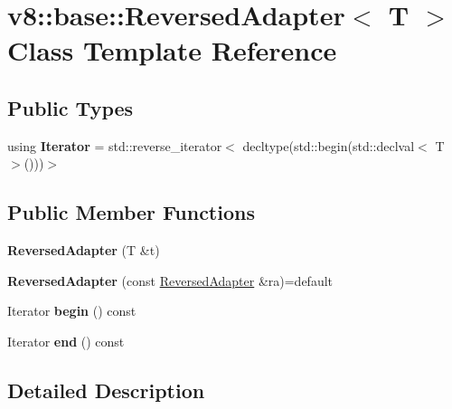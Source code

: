 \hypertarget{classv8_1_1base_1_1ReversedAdapter}{}\section{v8\+:\+:base\+:\+:Reversed\+Adapter$<$ T $>$ Class Template Reference}
\label{classv8_1_1base_1_1ReversedAdapter}
\subsection*{Public Types}
\begin{DoxyCompactItemize}
\item 
\mbox{\label{classv8_1_1base_1_1ReversedAdapter_a1d52674f92649bccf3cde1c36ccfffff}} 
using {\bfseries Iterator} = std\+::reverse\+\_\+iterator$<$ decltype(std\+::begin(std\+::declval$<$ T $>$()))$>$
\end{DoxyCompactItemize}
\subsection*{Public Member Functions}
\begin{DoxyCompactItemize}
\item 
\mbox{\label{classv8_1_1base_1_1ReversedAdapter_ad9fc47e5e56425656e5c2b9817edf28d}} 
{\bfseries Reversed\+Adapter} (T \&t)
\item 
\mbox{\label{classv8_1_1base_1_1ReversedAdapter_af3af23a33ebd8f4e7acea1acc7dec54f}} 
{\bfseries Reversed\+Adapter} (const \mbox{\hyperlink{classv8_1_1base_1_1ReversedAdapter}{Reversed\+Adapter}} \&ra)=default
\item 
\mbox{\label{classv8_1_1base_1_1ReversedAdapter_a363e7d0f3c0ac387d4568d675ff07dd6}} 
Iterator {\bfseries begin} () const
\item 
\mbox{\label{classv8_1_1base_1_1ReversedAdapter_ad63f387aad1fbd5610ec7c0f8833863d}} 
Iterator {\bfseries end} () const
\end{DoxyCompactItemize}


\subsection{Detailed Description}
